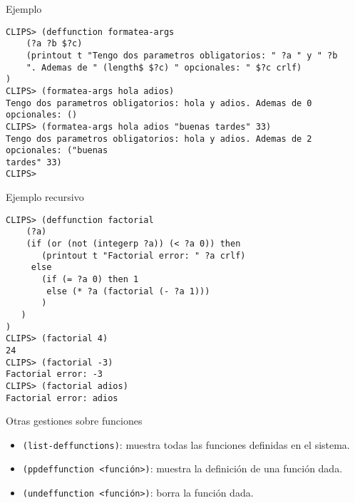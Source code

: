 \documentclass[usenames,dvipsnames,aspectratio=169]{beamer}
\begin{document}
\begin{frame}[fragile]{Ejemplo}
	\begin{verbatim}
CLIPS> (deffunction formatea-args
    (?a ?b $?c)
    (printout t "Tengo dos parametros obligatorios: " ?a " y " ?b
    ". Ademas de " (length$ $?c) " opcionales: " $?c crlf)
)
CLIPS> (formatea-args hola adios)
Tengo dos parametros obligatorios: hola y adios. Ademas de 0 opcionales: ()
CLIPS> (formatea-args hola adios "buenas tardes" 33)
Tengo dos parametros obligatorios: hola y adios. Ademas de 2 opcionales: ("buenas
tardes" 33)
CLIPS>
	\end{verbatim}
\end{frame}

\begin{frame}[fragile]{Ejemplo recursivo}
	\small
	\begin{verbatim}
CLIPS> (deffunction factorial
    (?a)
    (if (or (not (integerp ?a)) (< ?a 0)) then
       (printout t "Factorial error: " ?a crlf)
     else
       (if (= ?a 0) then 1
        else (* ?a (factorial (- ?a 1)))
       )
   )
)
CLIPS> (factorial 4)
24
CLIPS> (factorial -3)
Factorial error: -3
CLIPS> (factorial adios)
Factorial error: adios
	\end{verbatim}
\end{frame}

\begin{frame}{Otras gestiones sobre funciones}
	\begin{itemize}
		\item \texttt{(list-deffunctions)}: muestra todas las funciones definidas en el sistema.
		\item \texttt{(ppdeffunction <función>)}: muestra la definición de una función dada.
		\item \texttt{(undeffunction <función>)}: borra la función dada.
	\end{itemize}
\end{frame}
\end{document}
